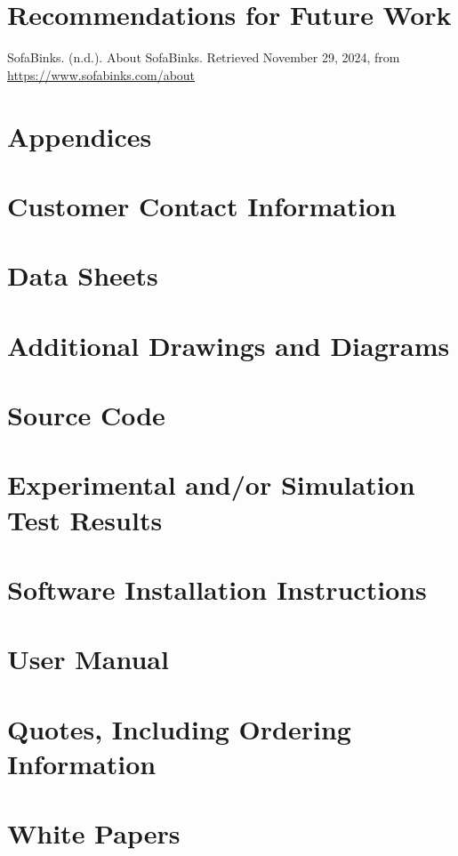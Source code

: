 \documentclass{article}
\begin{document}
\section{Recommendations for Future Work}

\begin{thebibliography}{99}
 SofaBinks. (n.d.). 
    About SofaBinks. Retrieved November 29, 2024, from \url{https://www.sofabinks.com/about}
\end{thebibliography}


\newpage
\section*{Appendices} %
\appendix
\section{Customer Contact Information}
\section{Data Sheets}
\section{Additional Drawings and Diagrams}
\section{Source Code} 
\section{Experimental and/or Simulation Test Results} 
\section{Software Installation Instructions} 
\section{User Manual} 
\section{Quotes, Including Ordering Information} 
\section{White Papers} 
\end{document}
